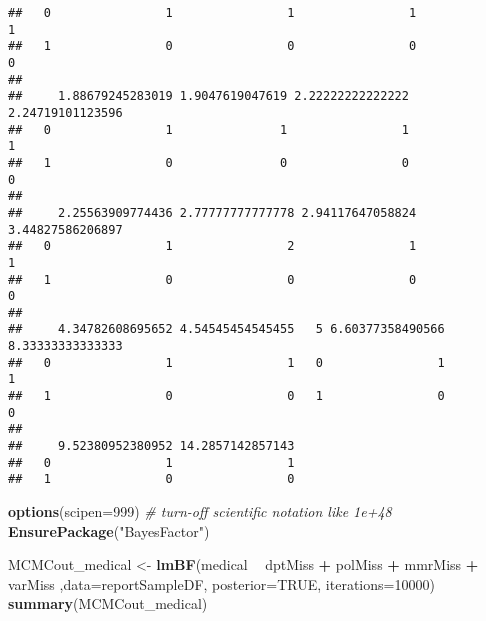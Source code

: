 \documentclass[]{article}
\newenvironment{Shaded}{\begin{snugshade}}{\end{snugshade}}
\newcommand{\CommentTok}[1]{\textcolor[rgb]{0.56,0.35,0.01}{\textit{#1}}}
\newcommand{\DataTypeTok}[1]{\textcolor[rgb]{0.13,0.29,0.53}{#1}}
\newcommand{\DecValTok}[1]{\textcolor[rgb]{0.00,0.00,0.81}{#1}}
\newcommand{\KeywordTok}[1]{\textcolor[rgb]{0.13,0.29,0.53}{\textbf{#1}}}
\newcommand{\NormalTok}[1]{#1}
\newcommand{\OperatorTok}[1]{\textcolor[rgb]{0.81,0.36,0.00}{\textbf{#1}}}
\newcommand{\OtherTok}[1]{\textcolor[rgb]{0.56,0.35,0.01}{#1}}
\newcommand{\StringTok}[1]{\textcolor[rgb]{0.31,0.60,0.02}{#1}}
\begin{document}
\begin{verbatim}
##   0                1                1                1                1
##   1                0                0                0                0
##    
##     1.88679245283019 1.9047619047619 2.22222222222222 2.24719101123596
##   0                1               1                1                1
##   1                0               0                0                0
##    
##     2.25563909774436 2.77777777777778 2.94117647058824 3.44827586206897
##   0                1                2                1                1
##   1                0                0                0                0
##    
##     4.34782608695652 4.54545454545455   5 6.60377358490566 8.33333333333333
##   0                1                1   0                1                1
##   1                0                0   1                0                0
##    
##     9.52380952380952 14.2857142857143
##   0                1                1
##   1                0                0
\end{verbatim}

\begin{Shaded}
\end{Shaded}

\begin{Shaded}
\begin{Highlighting}[]
\KeywordTok{options}\NormalTok{(}\DataTypeTok{scipen=}\DecValTok{999}\NormalTok{)  }\CommentTok{# turn-off scientific notation like 1e+48}
\KeywordTok{EnsurePackage}\NormalTok{(}\StringTok{"BayesFactor"}\NormalTok{)}

\NormalTok{MCMCout_medical <-}\StringTok{ }\KeywordTok{lmBF}\NormalTok{(medical }\OperatorTok{~}\StringTok{ }\NormalTok{dptMiss }\OperatorTok{+}\StringTok{ }\NormalTok{polMiss }\OperatorTok{+}\StringTok{ }\NormalTok{mmrMiss }\OperatorTok{+}\StringTok{ }\NormalTok{varMiss ,}\DataTypeTok{data=}\NormalTok{reportSampleDF, }\DataTypeTok{posterior=}\OtherTok{TRUE}\NormalTok{, }\DataTypeTok{iterations=}\DecValTok{10000}\NormalTok{)}
\KeywordTok{summary}\NormalTok{(MCMCout_medical)}
\end{Highlighting}
\end{Shaded}
\end{document}
